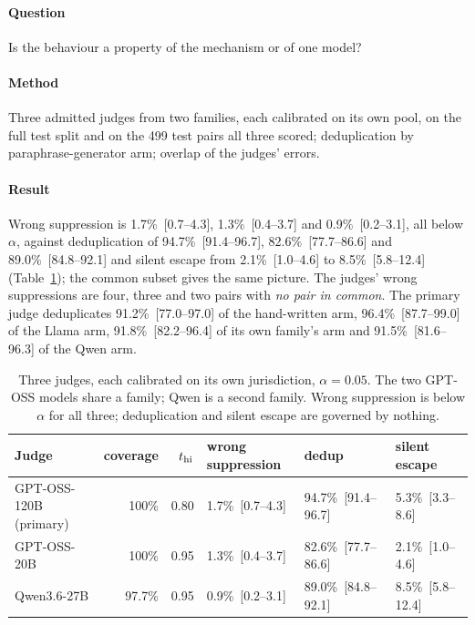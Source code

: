 \paragraph{Question} Is the behaviour a property of the mechanism or of one model?

\paragraph{Method} Three admitted judges from two families, each calibrated on its own pool, on the full test split and on the 499 test pairs all three scored; deduplication by paraphrase-generator arm; overlap of the judges' errors.

\paragraph{Result} Wrong suppression is 1.7\%~[0.7--4.3], 1.3\%~[0.4--3.7] and 0.9\%~[0.2--3.1], all below $\alpha$, against deduplication of 94.7\%~[91.4--96.7], 82.6\%~[77.7--86.6] and 89.0\%~[84.8--92.1] and silent escape from 2.1\%~[1.0--4.6] to 8.5\%~[5.8--12.4] (Table~\ref{tab:judges}); the common subset gives the same picture. The judges' wrong suppressions are four, three and two pairs with \emph{no pair in common}. The primary judge deduplicates 91.2\%~[77.0--97.0] of the hand-written arm, 96.4\%~[87.7--99.0] of the Llama arm, 91.8\%~[82.2--96.4] of its own family's arm and 91.5\%~[81.6--96.3] of the Qwen arm.

\begin{table}[!tbp]
\centering\scriptsize\setlength{\tabcolsep}{3.5pt}
\caption{Three judges, each calibrated on its own jurisdiction, $\alpha=0.05$. The two GPT-OSS models share a family; Qwen is a second family. Wrong suppression is below $\alpha$ for all three; deduplication and silent escape are governed by nothing.}\label{tab:judges}
\begin{tabular}{@{}lrrlll@{}}
\toprule
Judge & coverage & $t_{\mathrm{hi}}$ & wrong suppression & dedup & silent escape \\
\midrule
GPT-OSS-120B (primary) & 100\% & 0.80 & 1.7\%~[0.7--4.3] & 94.7\%~[91.4--96.7] & 5.3\%~[3.3--8.6] \\
GPT-OSS-20B & 100\% & 0.95 & 1.3\%~[0.4--3.7] & 82.6\%~[77.7--86.6] & 2.1\%~[1.0--4.6] \\
Qwen3.6-27B & 97.7\% & 0.95 & 0.9\%~[0.2--3.1] & 89.0\%~[84.8--92.1] & 8.5\%~[5.8--12.4] \\
\bottomrule
\end{tabular}
\end{table}

